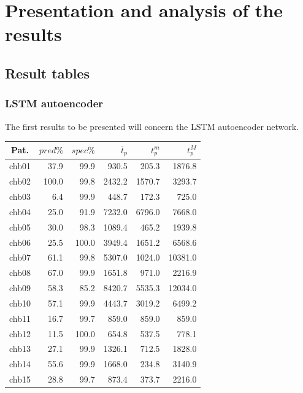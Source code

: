 \clearpage
\section{Presentation and analysis of the results}

\subsection{Result tables}

\subsubsection{LSTM autoencoder}
The first results to be presented will concern the \gls{LSTM} autoencoder network.

\begin{table}[ht]
    \centering
    \begin{tabular}{c|rrrrr}
    Pat.  & $pred\%$ & $spec\%$ & $\overline{t}_p$   & $t_p^m$  & $t_p^M$   \\ \hline
    chb01   & 37.9   & 99.9   & 930.5   & 205.3   & 1876.8  \\
    chb02   & 100.0  & 99.8   & 2432.2  & 1570.7  & 3293.7  \\
    chb03   & 6.4    & 99.9   & 448.7   & 172.3   & 725.0   \\
    chb04   & 25.0   & 91.9   & 7232.0  & 6796.0  & 7668.0  \\
    chb05   & 30.0   & 98.3   & 1089.4  & 465.2   & 1939.8  \\
    chb06   & 25.5   & 100.0  & 3949.4  & 1651.2  & 6568.6  \\
    chb07   & 61.1   & 99.8   & 5307.0  & 1024.0  & 10381.0 \\
    chb08   & 67.0   & 99.9   & 1651.8  & 971.0   & 2216.9  \\
    chb09   & 58.3   & 85.2   & 8420.7  & 5535.3  & 12034.0 \\
    chb10   & 57.1   & 99.9   & 4443.7  & 3019.2  & 6499.2  \\
    chb11   & 16.7   & 99.7   & 859.0   & 859.0   & 859.0   \\
    chb12   & 11.5   & 100.0  & 654.8   & 537.5   & 778.1   \\
    chb13   & 27.1   & 99.9   & 1326.1  & 712.5   & 1828.0  \\
    chb14   & 55.6   & 99.9   & 1668.0  & 234.8   & 3140.9  \\
    chb15   & 28.8   & 99.7   & 873.4   & 373.7   & 2216.0  \\

\end{tabular}
\end{table}
